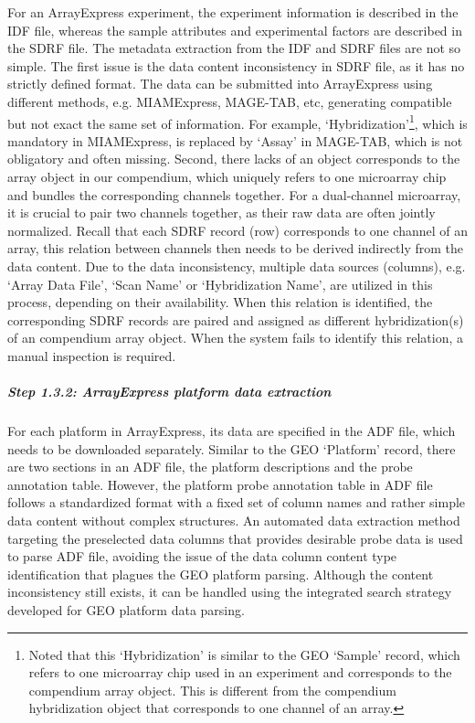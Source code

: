 For an ArrayExpress experiment, the experiment information is described in the IDF file, whereas the sample attributes and experimental factors are described in the SDRF file. The metadata extraction from the IDF and SDRF files are not so simple. The first issue is the data content inconsistency in SDRF file, as it has no strictly defined format. The data can be submitted into ArrayExpress using different methods, e.g. MIAMExpress, MAGE-TAB, etc, generating compatible but not exact the same set of information. For example, `Hybridization'\footnote{Noted that this `Hybridization' is   similar to the GEO `Sample' record, which refers to one microarray chip   used in an experiment and corresponds to the compendium array object.   This is different from the compendium hybridization object that   corresponds to one channel of an array.}, which is mandatory in MIAMExpress, is replaced by `Assay' in MAGE-TAB, which is not obligatory and often missing. Second, there lacks of an object corresponds to the array object in our compendium, which uniquely refers to one microarray chip and bundles the corresponding channels together. For a dual-channel microarray, it is crucial to pair two channels together, as their raw data are often jointly normalized. Recall that each SDRF record (row) corresponds to one channel of an array, this relation between channels then needs to be derived indirectly from the data content. Due to the data inconsistency, multiple data sources (columns), e.g. `Array Data File', `Scan Name' or `Hybridization Name', are utilized in this process, depending on their availability. When this relation is identified, the corresponding SDRF records are paired and assigned as different hybridization(s) of an compendium array object. When the system fails to identify this relation, a manual inspection is required.

\subparagraph{Step 1.3.2: ArrayExpress platform data extraction}

For each platform in ArrayExpress, its data are specified in the ADF file, which needs to be downloaded separately. Similar to the GEO `Platform' record, there are two sections in an ADF file, the platform descriptions and the probe annotation table. However, the platform probe annotation table in ADF file follows a standardized format with a fixed set of column names and rather simple data content without complex structures. An automated data extraction method targeting the preselected data columns that provides desirable probe data is used to parse ADF file, avoiding the issue of the data column content type identification that plagues the GEO platform parsing. Although the content inconsistency still exists, it can be handled using the integrated search strategy developed for GEO platform data parsing.

